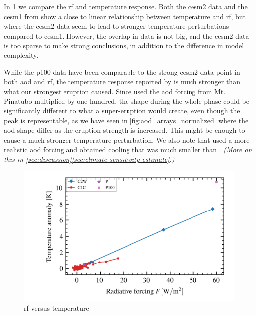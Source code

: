 \documentclass{ametsocV5}
\begin{document}
In \cref{fig:toa_vs_temp} we compare the \ac{rf} and temperature response. Both the
\ac{cesm2} data and the \ac{cesm1} from \citet{ottobliesner2016} show a close to linear
relationship between temperature and \ac{rf}, but where the \ac{cesm2} data seem to lead
to stronger temperature perturbations compared to \ac{cesm1}. However, the overlap in
data is not big, and the \ac{cesm2} data is too sparse to make strong conclusions, in
addition to the difference in model complexity.

While the \ac{p100} data have been comparable to the strong \ac{cesm2} data point in
both \ac{aod} and \ac{rf}, the temperature response reported by \citet{jones2005} is
much stronger than what our strongest eruption caused. Since \citet{jones2005} used the
\ac{aod} forcing from Mt. Pinatubo multiplied by one hundred, the shape during the whole
phase could be significantly different to what a super-eruption would create, even
though the peak is representable, as we have seen in \cref{fig:aod_arrays_normalized}
where the \ac{aod} shape differ as the eruption strength is increased. This might be
enough to cause a much stronger temperature perturbation. We also note that
\citet{timmreck2010} used a more realistic \ac{aod} forcing and obtained cooling that
was much smaller than \citet{jones2005}. \emph{(More on this in
  \cref{sec:discussion}\ref{sec:climate-sensitivity-estimate}.)}

\begin{figure}[t]
  \begin{center}
    \includegraphics[width=0.95\linewidth]{figures/toa_vs_temperature.png}
  \end{center}
  \caption{\ac{rf} versus temperature}%
  \label{fig:toa_vs_temp}
\end{figure}
\end{document}
